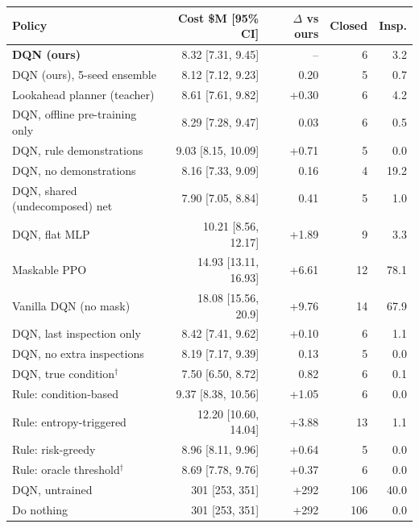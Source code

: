 \begin{tabular}{@{}lrrrr@{}}
\toprule
Policy & Cost \$M [95\% CI] & $\Delta$ vs ours & Closed & Insp. \\
\midrule
\textbf{DQN (ours)} & 8.32 [7.31, 9.45] & -- & 6 & 3.2 \\
DQN (ours), 5-seed ensemble & 8.12 [7.12, 9.23] & \textminus{}0.20 & 5 & 0.7 \\
Lookahead planner (teacher) & 8.61 [7.61, 9.82] & +0.30 & 6 & 4.2 \\
DQN, offline pre-training only & 8.29 [7.28, 9.47] & \textminus{}0.03 & 6 & 0.5 \\
DQN, rule demonstrations & 9.03 [8.15, 10.09] & +0.71 & 5 & 0.0 \\
DQN, no demonstrations & 8.16 [7.33, 9.09] & \textminus{}0.16 & 4 & 19.2 \\
DQN, shared (undecomposed) net & 7.90 [7.05, 8.84] & \textminus{}0.41 & 5 & 1.0 \\
DQN, flat MLP & 10.21 [8.56, 12.17] & +1.89 & 9 & 3.3 \\
Maskable PPO & 14.93 [13.11, 16.93] & +6.61 & 12 & 78.1 \\
Vanilla DQN (no mask) & 18.08 [15.56, 20.9] & +9.76 & 14 & 67.9 \\
DQN, last inspection only & 8.42 [7.41, 9.62] & +0.10 & 6 & 1.1 \\
DQN, no extra inspections & 8.19 [7.17, 9.39] & \textminus{}0.13 & 5 & 0.0 \\
DQN, true condition$^\dagger$ & 7.50 [6.50, 8.72] & \textminus{}0.82 & 6 & 0.1 \\
Rule: condition-based & 9.37 [8.38, 10.56] & +1.05 & 6 & 0.0 \\
Rule: entropy-triggered & 12.20 [10.60, 14.04] & +3.88 & 13 & 1.1 \\
Rule: risk-greedy & 8.96 [8.11, 9.96] & +0.64 & 5 & 0.0 \\
Rule: oracle threshold$^\dagger$ & 8.69 [7.78, 9.76] & +0.37 & 6 & 0.0 \\
DQN, untrained & 301 [253, 351] & +292 & 106 & 40.0 \\
Do nothing & 301 [253, 351] & +292 & 106 & 0.0 \\
\bottomrule
\end{tabular}
